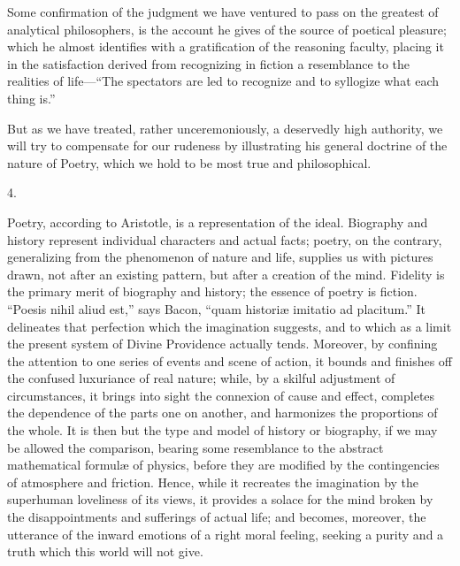 Some confirmation of the judgment we have ventured to pass on
the greatest of analytical philosophers, is the account he gives of
the source of poetical pleasure; which he almost identifies with a
gratification of the reasoning faculty, placing it in the satisfaction
derived from recognizing in fiction a resemblance to the realities of
life—``The spectators are led to recognize and to syllogize what
each thing is.''

But as we have treated, rather unceremoniously, a deservedly high
authority, we will try to compensate for our rudeness by illustrating
his general doctrine of the nature of Poetry, which we hold to be most
true and philosophical.

4.

Poetry, according to Aristotle, is a representation of the ideal.
Biography and history represent individual characters and actual
facts; poetry, on the contrary, generalizing from the phenomenon of
nature and life, supplies us with pictures drawn, not after an
existing pattern, but after a creation of the mind. Fidelity is the
primary merit of biography and history; the essence of poetry is
fiction. ``Poesis nihil aliud est,'' says Bacon, ``quam
historiæ imitatio ad placitum.'' It delineates that perfection
which the imagination suggests, and to which as a limit the present
system of Divine Providence actually tends. Moreover, by confining the
attention to one series of events and scene of action, it bounds and
finishes off the confused luxuriance of real nature; while, by a
skilful adjustment of circumstances, it brings into sight the
connexion of cause and effect, completes the dependence of the parts
one on another, and harmonizes the proportions of the whole. It is
then but the type and model of history or biography, if we may be
allowed the comparison, bearing some resemblance to the abstract mathematical formulæ of physics, before they are modified by the
contingencies of atmosphere and friction. Hence, while it recreates
the imagination by the superhuman loveliness of its views, it provides
a solace for the mind broken by the disappointments and sufferings of
actual life; and becomes, moreover, the utterance of the inward
emotions of a right moral feeling, seeking a purity and a truth which
this world will not give.

